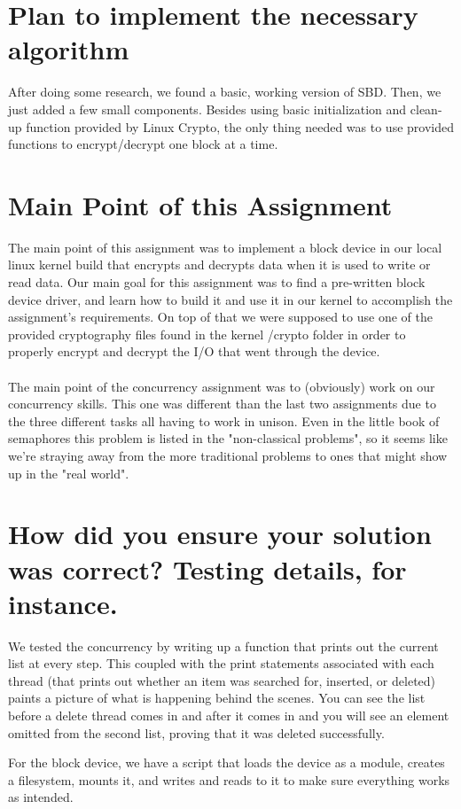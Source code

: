 \documentclass{article}
\begin{document}
\section{Plan to implement the necessary algorithm}
After doing some research, we found a basic, working version of SBD. Then, we just added a few small components. Besides using basic initialization and clean-up function provided by Linux Crypto, the only thing needed was to use provided functions to encrypt/decrypt one block at a time.

\section{Main Point of this Assignment}
The main point of this assignment was to implement a block device in our local linux 
kernel build that encrypts and decrypts data when it is used to write or read data. Our main
goal for this assignment was to find a pre-written block device driver, and learn how to 
build it and use it in our kernel to accomplish the assignment's requirements. On top of that 
we were supposed to use one of the provided cryptography files found in the kernel /crypto 
folder in order to properly encrypt and decrypt the I/O that went through the device.
\\\\
The main point of the concurrency assignment was to (obviously) work on our concurrency skills.
This one was different than the last two assignments due to the three different tasks all
having to work in unison. Even in the little book of semaphores this problem is listed in the
"non-classical problems", so it seems like we're straying away from the more traditional 
problems to ones that might show up in the "real world".
\section{How did you ensure your solution was correct? Testing details, for instance.}
We tested the concurrency by writing up a function that prints out the current list at every
step. This coupled with the print statements associated with each thread (that prints out 
whether an item was searched for, inserted, or deleted) paints a picture of what is happening
behind the scenes. You can see the list before a delete thread comes in and after it comes in
and you will see an element omitted from the second list, proving that it was deleted
successfully.

For the block device, we have a script that loads the device as a module, creates a filesystem, mounts it, and writes and reads to it to make sure everything works as intended.
\end{document}
